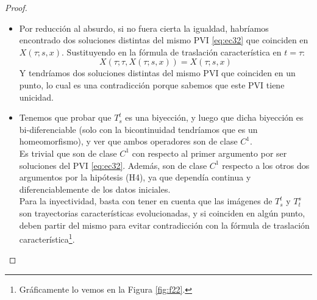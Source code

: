 \begin{proof}~
    \begin{itemize}
        \item[(i)] Por reducción al absurdo, si no fuera cierta la igualdad, habríamos encontrado dos soluciones distintas del mismo PVI \eqref{eq:ec32} 
        que coinciden en $X(\tau; s, x)$. Sustituyendo en la fórmula de traslación característica en $t = \tau$:
        $$X(\tau; \tau, X(\tau; s,x)) = X(\tau; s,x)$$
        Y tendríamos dos soluciones distintas del mismo PVI que coinciden en un punto, lo cual es una contradicción porque sabemos que este PVI
        tiene unicidad.
        \item[(ii)] Tenemos que probar que $T_s^t$ es una biyección, y luego que dicha biyección es bi-diferenciable (solo con la bicontinuidad tendríamos
        que es un homeomorfismo), y ver que ambos operadores son de clase $C^1$. \\

        Es trivial que son de clase $C^1$ con respecto al primer argumento por ser soluciones del PVI \eqref{eq:ec32}.
        Además, son de clase $C^1$ respecto a los otros dos argumentos por la hipótesis (H4), ya que dependía continua y diferenciablemente de los datos 
        iniciales. \\

        Para la inyectividad, basta con tener en cuenta que las imágenes de $T_s^t$ y $T_t^s$ son trayectorias características evolucionadas, y si 
        coinciden en algún punto, deben partir del mismo para evitar contradicción con la fórmula de traslación característica\footnote{Gráficamente lo vemos en la Figura \ref{fig:f22}.}. \\

        \begin{figure}
            \begin{center}

                \begin{tikzpicture}[x=0.75pt,y=0.75pt,yscale=-1,xscale=1]


\end{tikzpicture}
\end{center}
\end{figure}
\end{itemize}
\end{proof}
